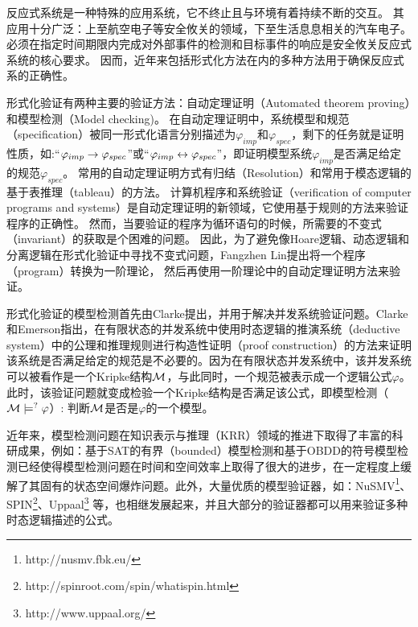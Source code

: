 反应式系统是一种特殊的应用系统，它不终止且与环境有着持续不断的交互。
其应用十分广泛：上至航空电子等安全攸关的领域，下至生活息息相关的汽车电子。
必须在指定时间期限内完成对外部事件的检测和目标事件的响应是安全攸关反应式系统的核心要求。
因而，近年来包括形式化方法在内的多种方法用于确保反应式系的正确性。


形式化验证有两种主要的验证方法：自动定理证明（Automated theorem proving）和模型检测（Model checking)。
在自动定理证明中，系统模型和规范（specification）被同一形式化语言分别描述为$\varphi_{imp}$和$\varphi_{spec}$，剩下的任务就是证明性质，如:“$\varphi_{imp}\rightarrow \varphi_{spec}$”或“$\varphi_{imp}\leftrightarrow\varphi_{spec}$”，即证明模型系统$\varphi_{imp}$是否满足给定的规范$\varphi_{spec}$。
常用的自动定理证明方式有归结（Resolution）\cite{DBLP:journals/jacm/Robinson65}和常用于模态逻辑的基于表推理（tableau）\cite{hughes1996new}的方法。
计算机程序和系统验证（verification of computer programs and systems）是自动定理证明的新领域，它使用基于规则的方法来验证程序的正确性。
然而，当要验证的程序为循环语句的时候，所需要的不变式（invariant）的获取是个困难的问题。
因此，为了避免像Hoare逻辑\cite{Hoare1969}、动态逻辑\cite{harel1979first}和分离逻辑\cite{DBLP:conf/lics/Reynolds02}在形式化验证中寻找不变式问题，Fangzhen Lin提出将一个程序（program）转换为一阶理论，
然后再使用一阶理论中的自动定理证明方法来验证\cite{DBLP:journals/ai/Lin16}。

形式化验证的模型检测首先由Clarke提出，并用于解决并发系统验证问题\cite{DBLP:conf/spin/Clarke08}。Clarke和Emerson指出，在有限状态的并发系统中使用时态逻辑的推演系统（deductive system）中的公理和推理规则进行构造性证明（proof construction）的方法来证明该系统是否满足给定的规范是不必要的\cite{clarke1981design}。因为在有限状态并发系统中，该并发系统可以被看作是一个Kripke结构${\cal M}$，与此同时，一个规范被表示成一个逻辑公式$\varphi$。此时，该验证问题就变成检验一个Kripke结构是否满足该公式，即模型检测（${\cal M}\models^? \varphi$）: 判断${\cal M}$是否是$\varphi$的一个模型。

近年来，模型检测问题在知识表示与推理（KRR）领域的推进下取得了丰富的科研成果，例如：基于SAT的有界（bounded）模型检测\cite{DBLP:journals/ac/BiereCCSZ03}和基于OBDD的符号模型检测\cite{burch1992symbolic}已经使得模型检测问题在时间和空间效率上取得了很大的进步，在一定程度上缓解了其固有的状态空间爆炸问题。此外，大量优质的模型验证器，如：NuSMV\footnote{http://nusmv.fbk.eu/}、SPIN\footnote{http://spinroot.com/spin/whatispin.html}、Uppaal\footnote{http://www.uppaal.org/} 等，也相继发展起来，并且大部分的验证器都可以用来验证多种时态逻辑描述的公式。  

